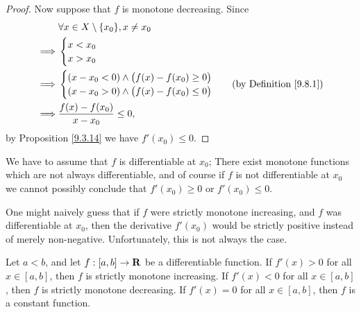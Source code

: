 \begin{proof}
    Now suppose that \(f\) is monotone decreasing.
    Since
    \begin{align*}
                 & \forall x \in X \setminus \{x_0\}, x \neq x_0      \\
        \implies & \begin{cases}
                       x < x_0 \\
                       x > x_0 \\
                   \end{cases}                                       \\
        \implies & \begin{cases}
                       (x - x_0 < 0) \land \big(f(x) - f(x_0) \geq 0\big) \\
                       (x - x_0 > 0) \land \big(f(x) - f(x_0) \leq 0\big) \\
                   \end{cases} & \text{(by Definition \ref{9.8.1})} \\
        \implies & \frac{f(x) - f(x_0)}{x - x_0} \leq 0,
    \end{align*}
    by Proposition \ref{9.3.14} we have \(f'(x_0) \leq 0\).
\end{proof}

\begin{remark}\label{10.3.2}
    We have to assume that \(f\) is differentiable at \(x_0\);
    There exist monotone functions which are not always differentiable, and of course if \(f\) is not differentiable at \(x_0\) we cannot possibly conclude that \(f'(x_0) \geq 0\) or \(f'(x_0) \leq 0\).
\end{remark}

\begin{note}
    One might naively guess that if \(f\) were strictly monotone increasing, and \(f\) was differentiable at \(x_0\), then the derivative \(f'(x_0)\) would be strictly positive instead of merely non-negative.
    Unfortunately, this is not always the case.
\end{note}

\begin{proposition}\label{10.3.3}
    Let \(a < b\), and let \(f : [a, b] \to \mathbf{R}\) be a differentiable function.
    If \(f'(x) > 0\) for all \(x \in [a, b]\), then \(f\) is strictly monotone increasing.
    If \(f'(x) < 0\) for all \(x \in [a, b]\), then \(f\) is strictly monotone decreasing.
    If \(f'(x) = 0\) for all \(x \in [a, b]\), then \(f\) is a constant function.
\end{proposition}

